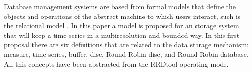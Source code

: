 Database management systems are based from formal models that define
the objects and operations of the abstract machine to which users
interact, such is the relational model \parencite{date}. In this paper
a model is proposed for an storage system that will keep a time series
in a multiresolution and bounded way.  In this first proposal there
are six definitions that are related to the data storage mechanism:
measure, time series, buffer, disc, Round Robin disc, and Round Robin
database. All this concepts have been abstracted from the RRDtool
operating mode.





